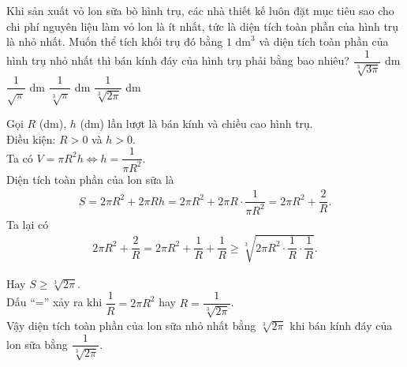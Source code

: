 \begin{ex}%
 Khi sản xuất vỏ lon sữa bò hình trụ, các nhà thiết kế luôn đặt mục tiêu sao cho chi phí nguyên liệu làm vỏ lon là ít nhất, tức là diện tích toàn phần của hình trụ là nhỏ nhất. Muốn thể tích khối trụ đó bằng $1 \textrm{ dm}^3$ và diện tích toàn phần của hình trụ nhỏ nhất thì bán kính đáy của hình trụ phải bằng bao nhiêu?
 \choice
  {$\dfrac{1}{\sqrt[3]{3\pi}}$ dm}
  {$\dfrac{1}{\sqrt{\pi}}$ dm}
  {$\dfrac{1}{\sqrt[3]{\pi}}$ dm}
  {\True $\dfrac{1}{\sqrt[3]{2\pi}}$ dm}
 \loigiai
  {
  \immini
  {
  Gọi $R$ (dm), $h$ (dm) lần lượt là bán kính và chiều cao hình trụ.\\
  Điều kiện: $R > 0$ và $h > 0$.\\
  Ta có $V = \pi R^2h \Leftrightarrow h = \dfrac{1}{\pi R^2}$.\\
  Diện tích toàn phần của lon sữa là
  \begin{eqnarray*}
   S = 2 \pi R^2 + 2 \pi Rh = 2 \pi R^2 + 2 \pi R \cdot \dfrac{1}{\pi R^2} = 2 \pi R^2 + \dfrac{2}{R}.
  \end{eqnarray*}
  Ta lại có
  \begin{eqnarray*}
   2 \pi R^2 + \dfrac{2}{R} = 2 \pi R^2 + \dfrac{1}{R} + \dfrac{1}{R} \geq \sqrt[3]{2\pi R^2 \cdot \dfrac{1}{R} \cdot \dfrac{1}{R}}.
  \end{eqnarray*}
  }
  {
  }
  \noindent
  Hay $S \geq \sqrt[3]{2\pi}$.\\
  Dấu ``='' xảy ra khi $\dfrac{1}{R} = 2 \pi R^2$ hay $R = \dfrac{1}{\sqrt[3]{2 \pi}}$.\\
  Vậy diện tích toàn phần của lon sữa nhỏ nhất bằng $\sqrt[3]{2\pi}$ khi bán kính đáy của lon sữa bằng $\dfrac{1}{\sqrt[3]{2 \pi}}$.
  }
\end{ex}

